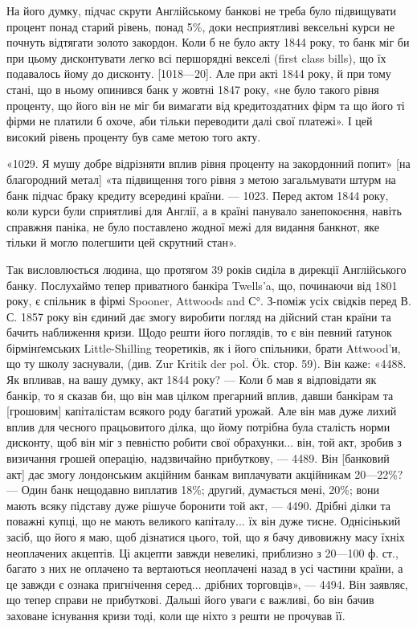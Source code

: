 На його думку, підчас скрути Англійському банкові не треба було підвищувати
процент понад старий рівень, понад 5\%, доки несприятливі вексельні
курси не почнуть відтягати золото закордон. Коли б не було акту 1844 року,
то банк міг би при цьому дисконтувати легко всі першорядні векселі (first class
bills), що їх подавалось йому до дисконту. [1018—20]. Але при акті 1844 року,
й при тому стані, що в ньому опинився банк у жовтні 1847 року, «не було
такого рівня проценту, що його він не міг би вимагати від кредитоздатних фірм
та що його ті фірми не платили б охоче, аби тільки переводити далі свої платежі».
І цей високий рівень проценту був саме метою того акту.

«1029. Я мушу добре відрізняти вплив рівня проценту на закордонний
попит» [на благородний метал] «та підвищення того рівня з метою загальмувати
штурм на банк підчас браку кредиту всередині країни. — 1023. Перед актом
1844 року, коли курси були сприятливі для Англії, а в країні панувало занепокоєння,
навіть справжня паніка, не було поставлено жодної межі для видання
банкнот, яке тільки й могло полегшити цей скрутний стан».

Так висловлюється людина, що протягом 39 років сиділа в дирекції Англійського
банку. Послухаймо тепер приватного банкіра Twells’a, що, починаючи
від 1801 року, є спільник в фірмі Spooner, Attwoods and С°. З-поміж усіх свідків
перед В. С. 1857 року він єдиний дає змогу виробити погляд на дійсний стан
країни та бачить наближення кризи. Щодо решти його поглядів, то є він певний
ґатунок бірмінґемських Little-Shilling теоретиків, як і його спільники, брати
Attwood’и, що ту школу заснували, (див. Zur Kritik der pol. Ök. стор. 59). Він
каже: «4488. Як впливав, на вашу думку, акт 1844 року? — Коли б мав я
відповідати як банкір, то я сказав би, що він мав цілком прегарний вплив,
давши банкірам та [грошовим] капіталістам всякого роду багатий урожай. Але
він мав дуже лихий вплив для чесного працьовитого ділка, що йому потрібна
була сталість норми дисконту, щоб він міг з певністю робити свої обрахунки...
він, той акт, зробив з визичання грошей операцію, надзвичайно прибуткову, —
4489. Він [банковий акт] дає змогу лондонським акційним банкам виплачувати
акційникам 20—22\%? — Один банк нещодавно виплатив 18\%; другий, думається
мені, 20\%; вони мають всяку підставу дуже рішуче боронити той акт, — 4490. Дрібні ділки та поважні
купці, що не мають великого капіталу... їх він
дуже тисне. Однісінький засіб, що його я маю, щоб дізнатися цього, той, що я
бачу дивовижну масу їхніх неоплачених акцептів. Ці акцепти завжди невеликі,
приблизно з 20—100 ф. ст., багато з них не оплачено та вертаються неоплачені
назад в усі частини країни, а це завжди є ознака пригнічення серед...
дрібних торговців», — 4494. Він заявляє, що тепер справи не прибуткові. Дальші
його уваги є важливі, бо він бачив заховане існування кризи тоді, коли ще
ніхто з решти не прочував її.

